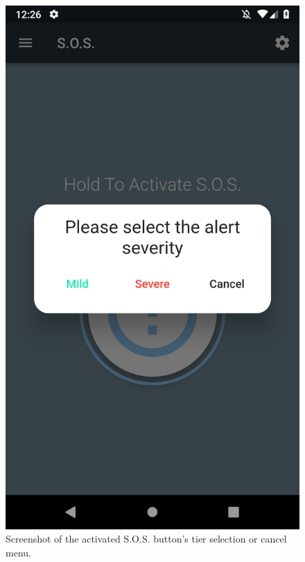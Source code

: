 \documentclass[10pt, a4paper]{article}
\begin{document}
\begin{figure}[H]
  \includegraphics[width=\linewidth]{final-diagrams/Emulator-Screenshots/Screenshot_1556126791.png}
  \caption{Screenshot of the activated S.O.S. button's tier selection or cancel menu.}
\endminipage\hfill
{}

\end{figure}
\end{document}
